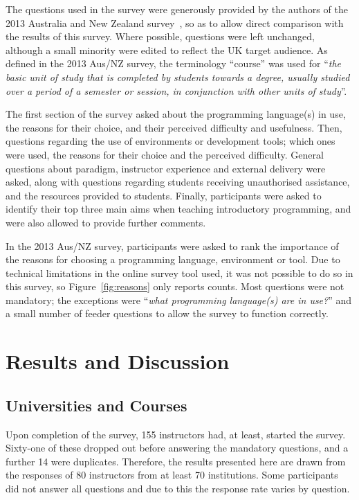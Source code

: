 \documentclass[a4paper,11pt]{article}
\begin{document}
The questions used in the survey were generously provided by the
authors of the 2013 Australia and New Zealand
survey~\cite{mason+cooper:2014}, so as to allow direct comparison
with the results of this survey. Where possible, questions were
left unchanged, although a small minority were edited to reflect the
UK target audience. As defined in the 2013 Aus/NZ survey, the
terminology ``course'' was used for ``{\emph{the basic unit of study that is
completed by students towards a degree, usually studied over a period
of a semester or session, in conjunction with other units of study}}''.

The first section of the survey asked about the programming
language(s) in use, the reasons for their choice, and their perceived
difficulty and usefulness. Then, questions regarding the use of
environments or development tools; which ones were used, the reasons
for their choice and the perceived difficulty. General questions about
paradigm, instructor experience and external delivery were asked,
along with questions regarding students receiving unauthorised
assistance, and the resources provided to students. Finally,
participants were asked to identify their top three main aims when
teaching introductory programming, and were also allowed to provide
further comments.

In the 2013 Aus/NZ survey, participants were asked to rank the
importance of the reasons for choosing a programming language,
environment or tool. Due to technical limitations in the online survey
tool used, it was not possible to do so in this survey, so
Figure~\ref{fig:reasons} only reports counts. Most questions were not
mandatory; the exceptions were ``{\emph{what programming language(s)
are in use?}}'' and a small number of feeder questions to allow the
survey to function correctly.

\section{Results and Discussion}\label{results}

\subsection{Universities and Courses}

Upon completion of the survey, 155 instructors had, at least, started
the survey. Sixty-one of these dropped out before answering the
mandatory questions, and a further 14 were duplicates. Therefore, the
results presented here are drawn from the responses of 80 instructors
from at least 70 institutions. Some participants did not answer all
questions and due to this the response rate varies by question.
\end{document}
